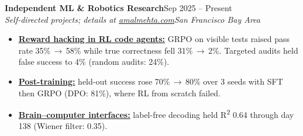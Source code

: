 \documentclass[10pt]{article}
\newcommand{\role}[4]{\par\vspace{5pt}\textbf{#1}\hfill#2\\\textit{#3}\hfill\textit{#4}\par}
\begin{document}
\role{Independent ML \& Robotics Research}{Sep 2025 -- Present}{Self-directed projects; details at \href{https://amalmehta.com/}{amalmehta.com}}{San Francisco Bay Area}
\begin{itemize}
\item \href{https://amalmehta.com/long_term_horizon_planning/}{\textbf{Reward hacking in RL code agents:}} GRPO on visible tests raised pass rate 35\%\,$\to$\,58\% while true correctness fell 31\%\,$\to$\,2\%. Targeted audits held false success to 4\% (random audits: 24\%).
\item \href{https://github.com/amalmehta/PostTrainingLab}{\textbf{Post-training:}} held-out success rose 70\%\,$\to$\,80\% over 3 seeds with SFT then GRPO (DPO: 81\%), where RL from scratch failed.
\item \href{https://github.com/amalmehta/BCIProjects}{\textbf{Brain--computer interfaces:}} label-free decoding held R\textsuperscript{2} 0.64 through day 138 (Wiener filter: 0.35).

\end{itemize}
\end{document}
